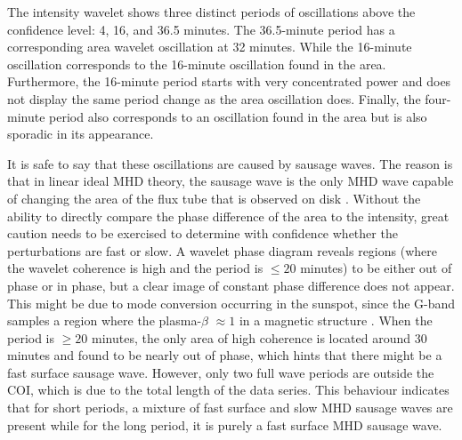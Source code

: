 	The intensity wavelet shows three distinct periods of oscillations above the confidence level: 4, 16, and 36.5 minutes.
	The 36.5-minute period has a corresponding area wavelet oscillation at 32 minutes.
	While the 16-minute oscillation corresponds to the 16-minute oscillation found in the area.
	Furthermore, the 16-minute period starts with very concentrated power and does not display the same period change as the area oscillation does.
	Finally, the four-minute period also corresponds to an oscillation found in the area but is also sporadic in its appearance.
	
	It is safe to say that these oscillations are caused by sausage waves.
	The reason is that in linear ideal MHD theory, the sausage wave is the only MHD wave capable of changing the area of the flux tube that is observed on disk \citep[see e.g.][]{2003A&A...397..765C,CLOO}.
	Without the ability to directly compare the phase difference of the area to the intensity, great caution needs to be exercised to determine with confidence whether the perturbations are fast or slow.
	A wavelet phase diagram reveals regions (where the wavelet coherence is high and the period is $\le 20$ minutes) to be either out of phase or in phase, but a clear image of constant phase difference does not appear.
	This might be due to mode conversion occurring in the sunspot, since the G-band samples a region where the plasma-$\beta$ $\approx 1$ in a magnetic structure \citep{gary}.
	When the period is $\ge 20$ minutes, the only area of high coherence is located around 30 minutes and found to be nearly out of phase, which hints that there might be a fast surface sausage wave.
	However, only two full wave periods are outside the COI, which is due to the total length of the data series.
	This behaviour indicates that for short periods, a mixture of fast surface and slow MHD sausage waves are present while for the long period, it is purely a fast surface MHD sausage wave.
		
